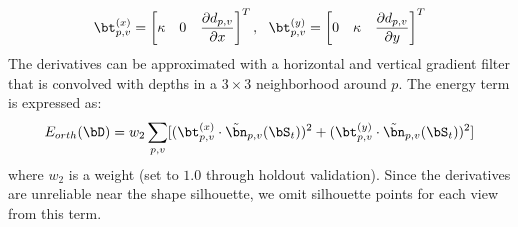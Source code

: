 \documentclass[10pt, conference, compsocconf]{IEEEtran}
\begin{document}
\vspace{-2mm}\begin{equation}
\bt_{p,v}^{(x)} = \left[ \kappa \quad 0 \quad \frac{\partial d_{p,v} }{\partial x} \right]^T,\,\,\ \bt_{p,v}^{(y)} = \left[ 0 \quad \kappa \quad \frac{\partial d_{p,v} }{\partial y} \right]^T \nonumber
\end{equation}\vskip -3mm
The derivatives can be approximated with a horizontal and vertical gradient filter that is convolved with depths in a $3 \times 3$ neighborhood around $p$. The energy term is expressed as:
\vspace{-1mm}\begin{equation}
E_{orth}(\bD) = w_2 \sum\limits_{p,v} [( \bt_{p,v}^{(x)} \cdot \tilde{\bn}_{p,v}(\bS_t) )^2 + ( \bt_{p,v}^{(y)} \cdot \tilde{\bn}_{p,v}(\bS_t) )^2] \nonumber
\end{equation}\vskip -3mm
where $w_2$ is a weight (set  to $1.0$ through holdout validation).
Since the  derivatives are unreliable near the shape silhouette, we omit silhouette points  for each view from this term.
\end{document}
